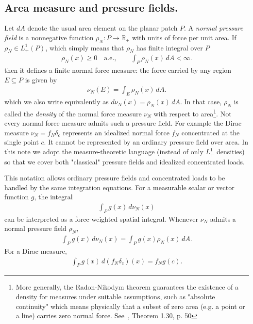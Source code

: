 \documentclass[11pt,a4paper]{article}
\theoremstyle{proposition}
\begin{document}
\subsection{Area measure and pressure fields.}
Let $dA$ denote the usual area element on the planar patch $P$.
A \textit{normal pressure field} is a nonnegative function $\rho_N:P\rightarrow\mathbb R_+$ with units of force per unit area. If $\rho_N\in L^1_+(P)$, which simply means that $\rho_N$ has finite integral over $P$
\begin{align}
\rho_N(x)\ge 0\quad\text{a.e.},
\qquad
\int_P \rho_N(x)\,dA<\infty.
\end{align}
then it defines a finite normal force measure: the force carried by any region $E\subseteq P$ is given by
\begin{align}
\nu_N(E) = \int_E \rho_N(x)\,dA.
\end{align}
which we also write equivalently as $d\nu_N(x)=\rho_N(x)\,dA$. In that case, $\rho_N$ is called the \textit{density} of the normal force measure $\nu_N$ with respect to area\footnote{More generally, the Radon-Nikodym theorem guarantees the existence of a density for measures under suitable assumptions, such as "absolute continuity" which means physically that a subset of zero area (e.g. a point or a line) carries zero normal force. See~\cite{evans2015measure}, Theorem 1.30, p. 50}. Not every normal force measure admits such a pressure field. For example the Dirac measure $\nu_N=f_N\delta_c$ represents an idealized normal force $f_N$ concentrated at the single point $c$. It cannot be represented by an ordinary pressure field over area. In this note we adopt the measure-theoretic language (instead of only $L_+^1$ densities) so that we cover both "classical" pressure fields and idealized concentrated loads.

This notation allows ordinary pressure fields and concentrated loads to be handled by the same integration equations. For a measurable scalar or vector function $g$, the integral 
\begin{align}
\int_P g(x)\,d\nu_N(x)
\end{align}
can be interpreted as a force-weighted spatial integral. 
Whenever $\nu_N$ admits a normal pressure field $\rho_N$,
\begin{align}
\int_P g(x)\,d\nu_N(x) = \int_P g(x)\rho_N(x)\,dA.
\end{align} 
For a Dirac measure,
\begin{align}
\int_P g(x)\,d(f_N\delta_c)(x) = f_Ng(c).
\end{align}
\end{document}
